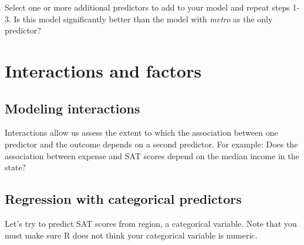 \documentclass[]{book}
\newenvironment{Shaded}{\begin{snugshade}}{\end{snugshade}}
\newcommand{\KeywordTok}[1]{\textcolor[rgb]{0.13,0.29,0.53}{\textbf{#1}}}
\newcommand{\DataTypeTok}[1]{\textcolor[rgb]{0.13,0.29,0.53}{#1}}
\newcommand{\StringTok}[1]{\textcolor[rgb]{0.31,0.60,0.02}{#1}}
\newcommand{\CommentTok}[1]{\textcolor[rgb]{0.56,0.35,0.01}{\textit{#1}}}
\newcommand{\OperatorTok}[1]{\textcolor[rgb]{0.81,0.36,0.00}{\textbf{#1}}}
\newcommand{\NormalTok}[1]{#1}
\begin{document}
Select one or more additional predictors to add to your model and repeat
steps 1-3. Is this model significantly better than the model with
\emph{metro} as the only predictor?

\section{Interactions and factors}\label{interactions-and-factors}

\subsection{Modeling interactions}\label{modeling-interactions}

Interactions allow us assess the extent to which the association between
one predictor and the outcome depends on a second predictor. For
example: Does the association between expense and SAT scores depend on
the median income in the state?

\begin{Shaded}
\end{Shaded}

\subsection{Regression with categorical
predictors}\label{regression-with-categorical-predictors}

Let's try to predict SAT scores from region, a categorical variable.
Note that you must make sure R does not think your categorical variable
is numeric.
\end{document}

